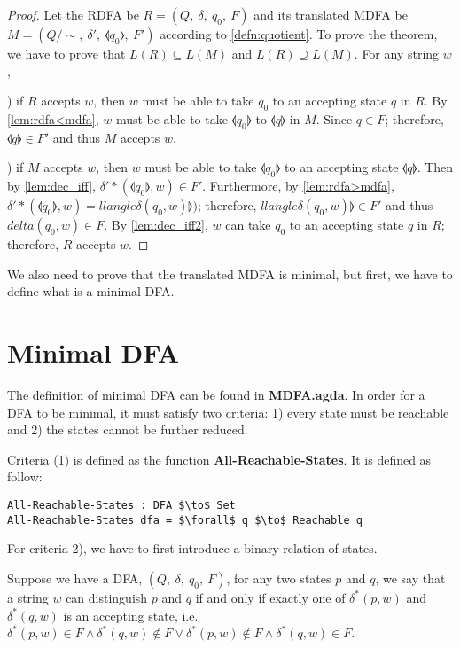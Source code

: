 \begin{proof}
\noindent Let the RDFA be \(R = (Q,\ \delta,\ q_0,\ F)\) and its
translated MDFA be \(M = (Q/\!\sim,\ \delta',\ \llangle q_0 \rrangle,\
F')\) according to \autoref{defn:quotient}. To prove the theorem, we
have to prove that \(L(R) \subseteq L(M)\) and \(L(R) \supseteq
L(M)\). For any string \(w\),

\par {}) if \(R\) accepts \(w\), then \(w\) must be able to
take \(q_0\) to an accepting state \(q\) in \(R\). By \autoref{lem:rdfa<mdfa},
\(w\) must be able to take \(\llangle q_0 \rrangle\) to \(\llangle q
\rrangle\) in \(M\). Since \(q \in F\); therefore, \(\llangle q
\rrangle \in F'\) and thus \(M\) accepts \(w\). 

\par {}) if \(M\) accepts \(w\), then \(w\) must be able to
take \(\llangle q_0 \rrangle\) to an accepting state \(\llangle q
\rrangle\). Then by \autoref{lem:dec_iff}, \(\delta'*(\llangle q_0
\rrangle,w) \in F'\). Furthermore, by \autoref{lem:rdfa>mdfa},
\(\delta'*(\llangle q_0 \rrangle,w) = llangle \delta(q_0,w)
\rrangle)\); therefore, \(llangle \delta(q_0,w) \rrangle \in F'\) and
thus \(delta(q_0,w) \in F\). By \autoref{lem:dec_iff2}, \(w\) can take
\(q_0\) to an accepting state \(q\) in \(R\); therefore, \(R\) accepts
\(w\). 
\end{proof}

\par We also need to prove that the translated MDFA is minimal, but
first, we have to define what is a minimal DFA. 


\section{Minimal DFA}
\par The definition of minimal DFA can be found in
\textbf{MDFA.agda}. In order for a DFA to be minimal,
it must satisfy two criteria: 1) every state must be reachable and 2) the
states cannot be further reduced. 

\par Criteria (1) is defined as the function
\textbf{All-Reachable-States}. It is defined as follow: 
\begin{lstlisting}[mathescape=true,xleftmargin=.3\textwidth]
All-Reachable-States : DFA $\to$ Set
All-Reachable-States dfa = $\forall$ q $\to$ Reachable q
\end{lstlisting}

\par For criteria 2), we have to first introduce a binary relation of states. 
\begin{defn}
\noindent Suppose we have a DFA, \((Q,\ \delta,\ q_0,\ F)\), for any two states \(p\) and \(q\), we say that a string
\(w\) can distinguish \(p\) and \(q\) if and only if exactly one of
\(\delta^*(p,w)\) and \(\delta^*(q,w)\) is an accepting state,
i.e. \(\delta^*(p,w) \in F \wedge \delta^*(q,w) \notin F \vee
\delta^*(p,w) \notin F \wedge \delta^*(q,w) \in F\). 
\end{defn}

